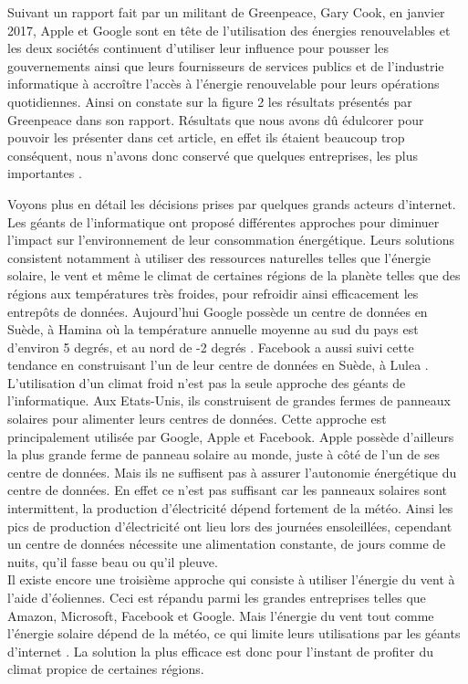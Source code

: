 \documentclass[a4paper,twocolumn,12pt]{article}
\begin{document}
	Suivant un rapport fait par un militant de Greenpeace, Gary Cook, en janvier 2017, Apple et Google sont en tête de l'utilisation des énergies renouvelables et les deux sociétés continuent d’utiliser leur influence pour pousser les gouvernements ainsi que leurs fournisseurs de services publics et de l’industrie informatique à accroître l'accès à l'énergie renouvelable pour leurs opérations quotidiennes. Ainsi on constate sur la figure 2 les résultats présentés par Greenpeace dans son rapport. Résultats que nous avons dû édulcorer pour pouvoir les présenter dans cet article, en effet ils étaient beaucoup trop conséquent, nous n’avons donc conservé que quelques entreprises, les plus importantes \cite{12}.
		
	Voyons plus en détail les décisions prises par quelques grands acteurs d’internet. Les géants de l’informatique ont proposé différentes approches pour diminuer l’impact sur l’environnement de leur consommation énergétique. Leurs solutions consistent notamment à utiliser des ressources naturelles telles que l'énergie solaire, le vent et même le climat de certaines régions de la planète telles que des régions aux températures très froides, pour refroidir ainsi efficacement les entrepôts de données. Aujourd’hui Google possède un centre de données en Suède, à Hamina où la température annuelle moyenne au sud du pays est d'environ 5 degrés, et au nord de -2 degrés \cite{13,14}. Facebook a aussi suivi cette tendance en construisant l’un de leur centre de données en Suède, à Lulea \cite{15}. \\
	
	L’utilisation d’un climat froid n'est pas la seule approche des géants de l’informatique. Aux Etats-Unis, ils construisent de grandes fermes de panneaux solaires pour alimenter leurs centres de données. Cette approche est principalement utilisée par Google, Apple et Facebook. Apple possède d’ailleurs la plus grande ferme de panneau solaire au monde, juste à côté de l’un de ses centre de données. Mais ils ne suffisent pas à assurer l’autonomie énergétique du centre de données. En effet ce n’est pas suffisant car les panneaux solaires sont intermittent, la production d'électricité dépend fortement de la météo. Ainsi les pics de production d'électricité ont lieu lors des journées ensoleillées, cependant un centre de données nécessite une alimentation constante, de jours comme de nuits, qu’il fasse beau ou qu’il pleuve. \\

	Il existe encore une troisième approche qui consiste à utiliser l'énergie du vent à l'aide d'éoliennes. Ceci est répandu parmi les grandes entreprises telles que Amazon, Microsoft, Facebook et Google. Mais l'énergie du vent tout comme l'énergie solaire dépend de la météo, ce qui limite leurs utilisations par les géants d'internet \cite{16}. La solution la plus efficace est donc pour l'instant de profiter du climat propice de certaines régions.
\end{document}

